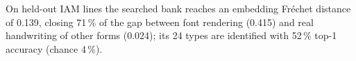On held-out IAM lines the searched bank reaches an embedding Fr\'echet distance of 0.139, closing 71\,\% of the gap between font rendering (0.415) and real handwriting of other forms (0.024); its 24 types are identified with 52\,\% top-1 accuracy (chance 4\,\%).
